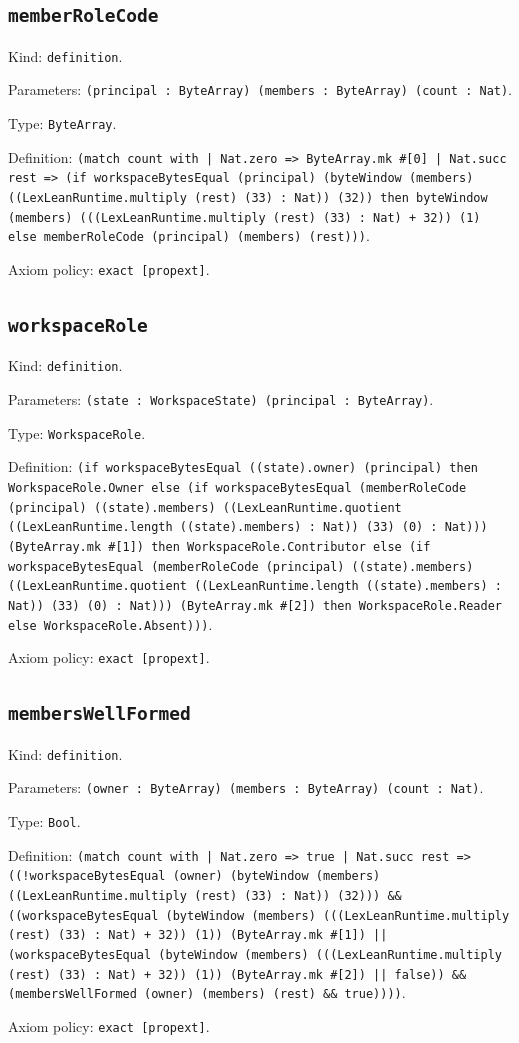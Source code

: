 \documentclass[11pt]{article}
\begin{document}
\subsection*{\texttt{memberRoleCode}}
\noindent Kind: \texttt{definition}.\par
\noindent Parameters: \texttt{(principal : ByteArray) (members : ByteArray) (count : Nat)}.\par
\noindent Type: \texttt{ByteArray}.\par
\noindent Definition: \texttt{(match count with | Nat.zero => ByteArray.mk \#[0] | Nat.succ rest => (if workspaceBytesEqual (principal) (byteWindow (members) ((LexLeanRuntime.multiply (rest) (33) : Nat)) (32)) then byteWindow (members) (((LexLeanRuntime.multiply (rest) (33) : Nat) + 32)) (1) else memberRoleCode (principal) (members) (rest)))}.\par
\noindent Axiom policy: \texttt{exact [propext]}.\par
\subsection*{\texttt{workspaceRole}}
\noindent Kind: \texttt{definition}.\par
\noindent Parameters: \texttt{(state : WorkspaceState) (principal : ByteArray)}.\par
\noindent Type: \texttt{WorkspaceRole}.\par
\noindent Definition: \texttt{(if workspaceBytesEqual ((state).owner) (principal) then WorkspaceRole.Owner else (if workspaceBytesEqual (memberRoleCode (principal) ((state).members) ((LexLeanRuntime.quotient ((LexLeanRuntime.length ((state).members) : Nat)) (33) (0) : Nat))) (ByteArray.mk \#[1]) then WorkspaceRole.Contributor else (if workspaceBytesEqual (memberRoleCode (principal) ((state).members) ((LexLeanRuntime.quotient ((LexLeanRuntime.length ((state).members) : Nat)) (33) (0) : Nat))) (ByteArray.mk \#[2]) then WorkspaceRole.Reader else WorkspaceRole.Absent)))}.\par
\noindent Axiom policy: \texttt{exact [propext]}.\par
\subsection*{\texttt{membersWellFormed}}
\noindent Kind: \texttt{definition}.\par
\noindent Parameters: \texttt{(owner : ByteArray) (members : ByteArray) (count : Nat)}.\par
\noindent Type: \texttt{Bool}.\par
\noindent Definition: \texttt{(match count with | Nat.zero => true | Nat.succ rest => ((!workspaceBytesEqual (owner) (byteWindow (members) ((LexLeanRuntime.multiply (rest) (33) : Nat)) (32))) \&\& ((workspaceBytesEqual (byteWindow (members) (((LexLeanRuntime.multiply (rest) (33) : Nat) + 32)) (1)) (ByteArray.mk \#[1]) || (workspaceBytesEqual (byteWindow (members) (((LexLeanRuntime.multiply (rest) (33) : Nat) + 32)) (1)) (ByteArray.mk \#[2]) || false)) \&\& (membersWellFormed (owner) (members) (rest) \&\& true))))}.\par
\noindent Axiom policy: \texttt{exact [propext]}.\par
\end{document}
